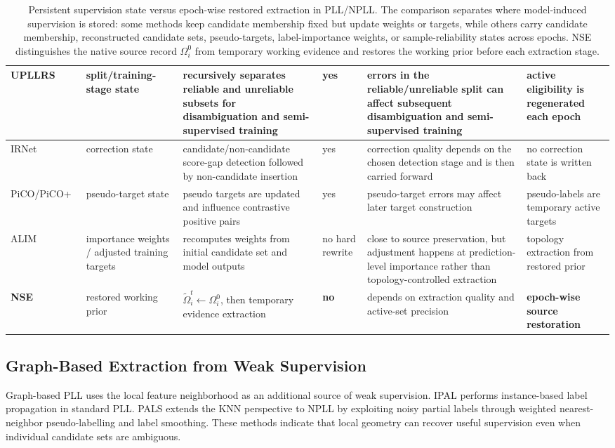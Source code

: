 \begin{table}[t]
\begin{tabular}{p{}p{}p{}p{}p{}p{}}
\hline
UPLLRS~\cite{Shi2023Unreliable} & split/training-stage state & recursively separates reliable and unreliable subsets for disambiguation and semi-supervised training & yes & errors in the reliable/unreliable split can affect subsequent disambiguation and semi-supervised training & active eligibility is regenerated each epoch \\
\hline
IRNet~\cite{lian2023irnet} & correction state & candidate/non-candidate score-gap detection followed by non-candidate insertion & yes & correction quality depends on the chosen detection stage and is then carried forward & no correction state is written back \\
\hline
PiCO/PiCO+~\cite{wang2022pico,wang2022pico+} & pseudo-target state & pseudo targets are updated and influence contrastive positive pairs & yes & pseudo-target errors may affect later target construction & pseudo-labels are temporary active targets \\
\hline
ALIM~\cite{xu2023alim} & importance weights / adjusted training targets & recomputes weights from initial candidate set and model outputs & no hard rewrite & close to source preservation, but adjustment happens at prediction-level importance rather than topology-controlled extraction & topology extraction from restored prior \\
\hline
\textbf{NSE} & restored working prior & $\tilde{\Omega}_i^t \leftarrow \Omega_i^0$, then temporary evidence extraction & \textbf{no} & depends on extraction quality and active-set precision & \textbf{epoch-wise source restoration} \\
\bottomrule
\end{tabular}
\caption{Persistent supervision state versus epoch-wise restored extraction in PLL/NPLL. The comparison separates where model-induced supervision is stored: some methods keep candidate membership fixed but update weights or targets, while others carry candidate membership, reconstructed candidate sets, pseudo-targets, label-importance weights, or sample-reliability states across epochs. NSE distinguishes the native source record $\Omega_i^0$ from temporary working evidence and restores the working prior before each extraction stage.}
\label{tab:method_positioning}
\end{table}

\subsection{Graph-Based Extraction from Weak Supervision}
Graph-based PLL uses the local feature neighborhood as an additional source of
weak supervision. IPAL \cite{zhang2015solving} performs instance-based label
propagation in standard PLL. PALS \cite{pals2025} extends the KNN perspective to
NPLL by exploiting noisy partial labels through weighted nearest-neighbor
pseudo-labelling and label smoothing. These methods indicate that local
geometry can recover useful supervision even when individual candidate sets are
ambiguous.

